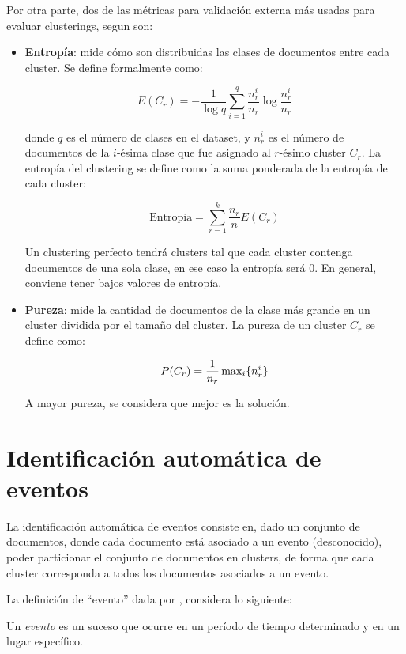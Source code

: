     Por otra parte, dos de las métricas para validación externa más
    usadas para evaluar clusterings, segun
    \cite{Zhao02criterionfunctions} son:

\begin{itemize}
\item \textbf{Entropía}: mide cómo son distribuidas las clases de documentos
      entre cada cluster. Se define formalmente como:

      $$E(C_r) = -\frac{1}{\log q}\sum_{i=1}^q\frac{n^i_r}{n_r}\log\frac{n^i_r}{n_r}$$

      donde $q$ es el número de clases en el dataset, y $n^i_r$ es el
      número de documentos de la $i$-ésima clase que fue asignado al
      $r$-ésimo cluster $C_r$. La entropía del clustering se define
      como la suma ponderada de la entropía de cada cluster:

      $$\textrm{Entropia} = \sum_{r=1}^k \frac{n_r}{n} E(C_r)$$

      Un clustering perfecto tendrá clusters tal que cada cluster
      contenga documentos de una sola clase, en ese caso la entropía
      será 0. En general, conviene tener bajos valores de entropía.
\item \textbf{Pureza}: mide la cantidad de documentos de la clase más grande
      en un cluster dividida por el tamaño del cluster. La pureza de
      un cluster $C_r$ se define como:

      $$P(C_r) = \frac{1}{n_r} \operatorname{max}_i\{n^i_r\}$$

      A mayor pureza, se considera que mejor es la solución.
\end{itemize}

\section{Identificación automática de eventos}
\label{sec-2.3}
   La identificación automática de eventos consiste en, dado un
   conjunto de documentos, donde cada documento está asociado a un
   evento (desconocido), poder particionar el conjunto de
   documentos en clusters, de forma que cada cluster corresponda a
   todos los documentos asociados a un evento.

   La definición de ``evento'' dada por
   \cite{Yang:1999:LAD:630307.630471}, considera lo siguiente:

   \begin{defn} Un \emph{evento} es un suceso que ocurre en un período de tiempo
   determinado y en un lugar específico. \end{defn}

